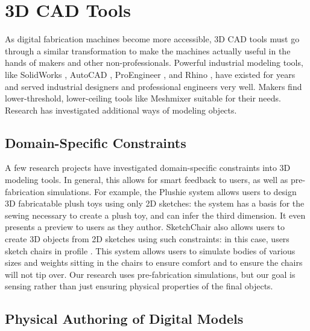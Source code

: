 \section{3D CAD Tools}
    As digital fabrication machines become more accessible, 3D CAD tools must go through a similar transformation to make the machines actually useful in the hands of makers and other non-professionals. Powerful industrial modeling tools, like SolidWorks \cite{solidworks}, AutoCAD \cite{autocad}, ProEngineer \cite{proe}, and Rhino \cite{rhino}, have existed for years and served industrial designers and professional engineers very well. Makers find lower-threshold, lower-ceiling tools like Meshmixer \cite{schmidt-meshmixer} suitable for their needs. Research has investigated additional ways of modeling objects.

    \subsection{Domain-Specific Constraints}

    A few research projects have investigated domain-specific constraints into 3D modeling tools. In general, this allows for smart feedback to users, as well as pre-fabrication simulations. For example, the Plushie system \cite{mori-plushie} allows users to design 3D fabricatable plush toys using only 2D sketches: the system has a basis for the sewing necessary to create a plush toy, and can infer the third dimension. It even presents a preview to users as they author. SketchChair also allows users to create 3D objects from 2D sketches using such constraints: in this case, users sketch chairs in profile \cite{saul-sketchchair}. This system allows users to simulate bodies of various sizes and weights sitting in the chairs to ensure comfort and to ensure the chairs will not tip over. Our research uses pre-fabrication simulations, but our goal is sensing rather than just ensuring physical properties of the final objects.

    \subsection{Physical Authoring of Digital Models}

